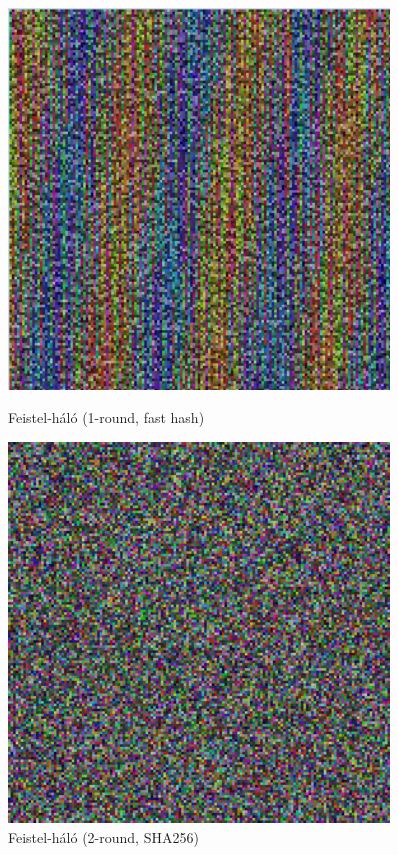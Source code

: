\documentclass[
    parspace,
    noindent,
    nohyp,
]{elteiktdk}[2023/04/10]
\begin{document}
\begin{figure}[H]
  \hspace*{\fill}
  \begin{minipage}[b]{0.45\textwidth}
    \centering
    \includegraphics[width=0.9\textwidth]{image/permutation-feif1.png}
    \caption{Feistel-háló (1-round, fast hash)}
  \end{minipage}
  \hspace*{\fill}
  \begin{minipage}[b]{0.45\textwidth}
    \centering
    \includegraphics[width=0.9\textwidth]{image/permutation-feis2.png}
    \caption{Feistel-háló (2-round, SHA256)}
  \end{minipage}
  \hspace*{\fill}
\end{figure}
\end{document}
